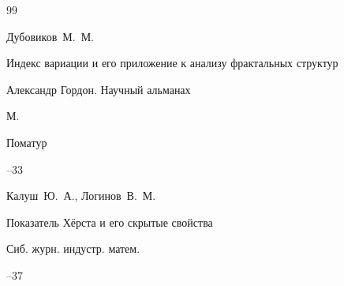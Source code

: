 \begin{thebibliography}{99}














\by Дубовиков~М.~М.

\paper Индекс вариации и его приложение к анализу фрактальных структур  

\inbook Александр Гордон. Научный альманах



\publaddr М.

\publ Поматур

--33














\by Калуш~Ю.~А., Логинов~В.~М.

\paper Показатель Хёрста и его скрытые свойства

\jour Сиб. журн. индустр. матем.




--37






\end{thebibliography}
